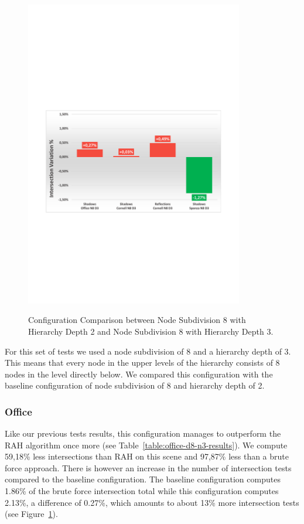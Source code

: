 \begin{figure}[!htb]
    \begin{center}
    \includegraphics[width=0.85\textwidth]{Images/Chart_Comparison_N8_D2_N8_D3}
    \label{fig:comparison-results-d8-n2-d8-n3}
    \caption{Configuration Comparison between Node Subdivision 8 with Hierarchy Depth 2 and Node Subdivision 8 with Hierarchy Depth 3.}
    \end{center}
\end{figure}

For this set of tests we used a node subdivision of 8 and a hierarchy depth of 3. This means that every node in the upper levels of the hierarchy consists of 8 nodes in the level directly below. We compared this configuration with the baseline configuration of node subdivision of 8 and hierarchy depth of 2.

\subsubsection{Office}

Like our previous tests results, this configuration manages to outperform the RAH algorithm once more (see Table~\ref{table:office-d8-n3-results}). We compute 59,18\% less intersections than RAH on this scene and 97,87\% less than a brute force approach. There is however an increase in the number of intersection tests compared to the baseline configuration. The baseline configuration computes 1.86\% of the brute force intersection total while this configuration computes 2.13\%, a difference of 0.27\%, which amounts to about 13\% more intersection tests (see Figure~\ref{fig:comparison-results-d8-n2-d8-n3}).

